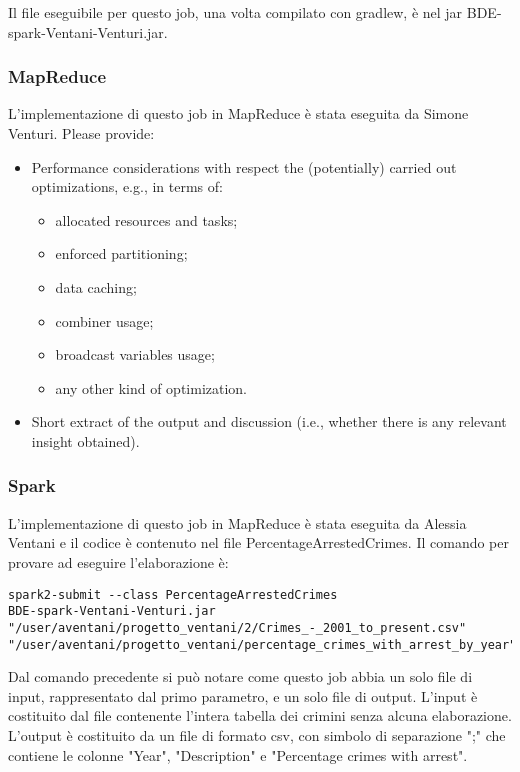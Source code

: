 \documentclass[10pt]{article}
\begin{document}
Il file eseguibile per questo job, una volta compilato con gradlew, è nel jar BDE-spark-Ventani-Venturi.jar. 

\subsubsection{MapReduce}
L'implementazione di questo job in MapReduce è stata eseguita da Simone Venturi.
Please provide:
\begin{itemize}
\item Performance considerations with respect the (potentially) carried out optimizations, e.g., in terms of:
\begin{itemize}
\item allocated resources and tasks;
\item enforced partitioning;
\item data caching;
\item combiner usage;
\item broadcast variables usage;
\item any other kind of optimization.
\end{itemize}
\item Short extract of the output and discussion (i.e., whether there is any relevant insight obtained).
\end{itemize}

\subsubsection{Spark}
L'implementazione di questo job in MapReduce è stata eseguita da Alessia Ventani e il codice è contenuto nel file PercentageArrestedCrimes.
Il comando per provare ad eseguire l'elaborazione è:
\begin{lstlisting}
spark2-submit --class PercentageArrestedCrimes 
BDE-spark-Ventani-Venturi.jar 
"/user/aventani/progetto_ventani/2/Crimes_-_2001_to_present.csv" 
"/user/aventani/progetto_ventani/percentage_crimes_with_arrest_by_year"
\end{lstlisting}

Dal comando precedente si può notare come questo job abbia un solo file di input, rappresentato dal primo parametro, e un solo file di output. L'input è costituito dal file contenente l'intera tabella dei crimini senza alcuna elaborazione. L'output è costituito da un file di formato csv, con simbolo di separazione ";" che contiene le colonne "Year", "Description" e "Percentage crimes with arrest". \\
\end{document}
